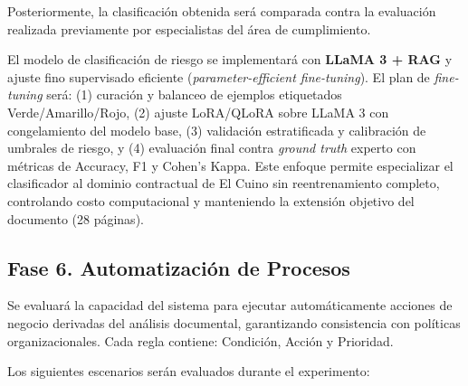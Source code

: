 \documentclass[12pt]{article}
\begin{document}
Posteriormente, la clasificación obtenida será comparada contra la evaluación realizada previamente por especialistas del área de cumplimiento.

El modelo de clasificación de riesgo se implementará con \textbf{LLaMA 3 + RAG} y ajuste fino supervisado eficiente (\textit{parameter-efficient fine-tuning}). El plan de \textit{fine-tuning} será: (1) curación y balanceo de ejemplos etiquetados Verde/Amarillo/Rojo, (2) ajuste LoRA/QLoRA sobre LLaMA 3 con congelamiento del modelo base, (3) validación estratificada y calibración de umbrales de riesgo, y (4) evaluación final contra \textit{ground truth} experto con métricas de Accuracy, F1 y Cohen's Kappa. Este enfoque permite especializar el clasificador al dominio contractual de El Cuino sin reentrenamiento completo, controlando costo computacional y manteniendo la extensión objetivo del documento (28 páginas).

\subsection{Fase 6. Automatización de Procesos}
Se evaluará la capacidad del sistema para ejecutar automáticamente acciones de negocio derivadas del análisis documental, garantizando consistencia con políticas organizacionales. Cada regla contiene: Condición, Acción y Prioridad.

Los siguientes escenarios serán evaluados durante el experimento:
\end{document}

